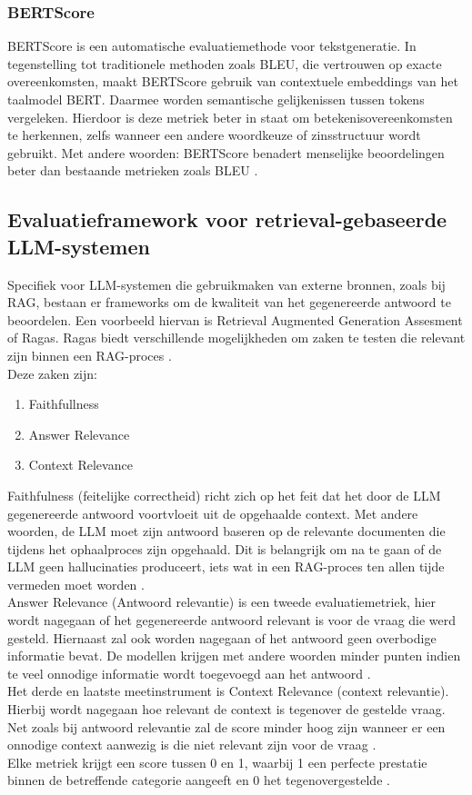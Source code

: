 \subsubsection{BERTScore}

BERTScore is een automatische evaluatiemethode voor tekstgeneratie. In tegenstelling tot traditionele methoden zoals BLEU, die vertrouwen op exacte overeenkomsten, maakt BERTScore gebruik van contextuele embeddings van het taalmodel BERT. Daarmee worden semantische gelijkenissen tussen tokens vergeleken. Hierdoor is deze metriek beter in staat om betekenisovereenkomsten te herkennen, zelfs wanneer een andere woordkeuze of zinsstructuur wordt gebruikt. Met andere woorden: BERTScore benadert menselijke beoordelingen beter dan bestaande metrieken zoals BLEU \autocite{Zhang2019}.

\subsection{Evaluatieframework voor retrieval-gebaseerde LLM-systemen}

Specifiek voor LLM-systemen die gebruikmaken van externe bronnen, zoals bij RAG, bestaan er frameworks om de kwaliteit van het gegenereerde antwoord te beoordelen. Een voorbeeld hiervan is Retrieval Augmented Generation Assesment of Ragas. Ragas biedt verschillende mogelijkheden om zaken te testen die relevant zijn binnen een RAG-proces \autocite{Es2023}.
\\[1em]
Deze zaken zijn:
\begin{enumerate}
    \item Faithfullness
    \item Answer Relevance
    \item Context Relevance
\end{enumerate}

Faithfulness (feitelijke correctheid) richt zich op het feit dat het door de LLM gegenereerde antwoord voortvloeit uit de opgehaalde context. Met andere woorden, de LLM moet zijn antwoord baseren op de relevante documenten die tijdens het ophaalproces zijn opgehaald. Dit is belangrijk om na te gaan of de LLM geen hallucinaties produceert, iets wat in een RAG-proces ten allen tijde vermeden moet worden \autocite{Es2023}.
\\[1em]
Answer Relevance (Antwoord relevantie) is een tweede evaluatiemetriek, hier wordt nagegaan of het gegenereerde antwoord relevant is voor de vraag die werd gesteld. Hiernaast zal ook worden nagegaan of het antwoord geen overbodige informatie bevat. De modellen krijgen met andere woorden minder punten indien te veel onnodige informatie wordt toegevoegd aan het antwoord \autocite{Es2023}.
\\[1em]
Het derde en laatste meetinstrument is Context Relevance (context relevantie). Hierbij wordt nagegaan hoe relevant de context is tegenover de gestelde vraag. Net zoals bij antwoord relevantie zal de score minder hoog zijn wanneer er een onnodige context aanwezig is die niet relevant zijn voor de vraag \autocite{Es2023}. 
\\[1em]
Elke metriek krijgt een score tussen 0 en 1, waarbij 1 een perfecte prestatie binnen de betreffende categorie aangeeft en 0 het tegenovergestelde \autocite{Es2023}.

